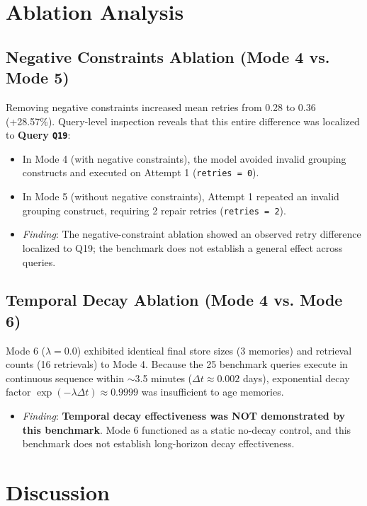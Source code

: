 \section{Ablation Analysis}

\subsection{Negative Constraints Ablation (Mode 4 vs. Mode 5)}
Removing negative constraints increased mean retries from 0.28 to 0.36 (+28.57\%). Query-level inspection reveals that this entire difference was localized to \textbf{Query \texttt{Q19}}:
\begin{itemize}
    \item In Mode 4 (with negative constraints), the model avoided invalid grouping constructs and executed on Attempt 1 (\texttt{retries = 0}).
    \item In Mode 5 (without negative constraints), Attempt 1 repeated an invalid grouping construct, requiring 2 repair retries (\texttt{retries = 2}).
    \item \textit{Finding}: The negative-constraint ablation showed an observed retry difference localized to Q19; the benchmark does not establish a general effect across queries.
\end{itemize}

\subsection{Temporal Decay Ablation (Mode 4 vs. Mode 6)}
Mode 6 ($\lambda = 0.0$) exhibited identical final store sizes (3 memories) and retrieval counts (16 retrievals) to Mode 4. Because the 25 benchmark queries execute in continuous sequence within $\sim$3.5 minutes ($\Delta t \approx 0.002$ days), exponential decay factor $\exp(-\lambda \Delta t) \approx 0.9999$ was insufficient to age memories.
\begin{itemize}
    \item \textit{Finding}: \textbf{Temporal decay effectiveness was NOT demonstrated by this benchmark}. Mode 6 functioned as a static no-decay control, and this benchmark does not establish long-horizon decay effectiveness.
\end{itemize}

\section{Discussion}

